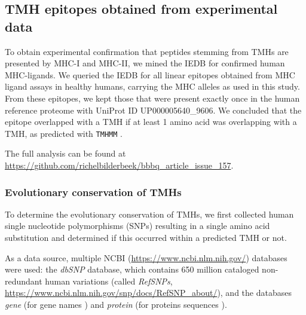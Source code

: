 \documentclass[utf8]{frontiersSCNS} %
\begin{document}
\subsection{TMH epitopes obtained from experimental data}\label{subsec:elution_studies}

To obtain experimental confirmation that peptides stemming from TMHs 
are presented by MHC-I and MHC-II,
we mined the IEDB \citep{vita2019immune}
for confirmed human MHC-ligands.
We queried the IEDB for all linear epitopes obtained
from MHC ligand assays in healthy humans, 
carrying the MHC alleles as used in this study.
From these epitopes, we kept those that were present
exactly once in the human reference proteome
with UniProt ID UP000005640\_9606.
We concluded that the epitope overlapped with a TMH if at least 1 amino acid was overlapping with a TMH, as predicted with \verb;TMHMM; \cite{krogh2001predicting}.

The full analysis can be found
at \url{https://github.com/richelbilderbeek/bbbq_article_issue_157}.

\subsubsection{Evolutionary conservation of TMHs}


To determine the evolutionary conservation of TMHs, we first
collected human single nucleotide polymorphisms (SNPs)
resulting in a single amino acid substitution and determined if
this occurred within a predicted TMH or not.


As a data source, multiple
NCBI (\url{https://www.ncbi.nlm.nih.gov/}) databases were used: 
the \emph{dbSNP} \citep{sherry2001dbsnp} database,
which contains 650 million 
cataloged non-redundant human variations (called \emph{RefSNPs},
\url{https://www.ncbi.nlm.nih.gov/snp/docs/RefSNP_about/}), and the databases \emph{gene} (for gene names \citep{brown2015gene})
and \emph{protein} (for proteins sequences \citep{sayers2010database}).
\end{document}
